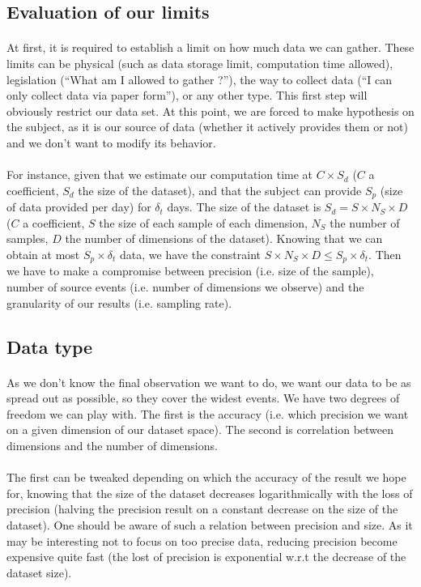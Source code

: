 \documentclass[twoside]{report}
\begin{document}
	\subsection{Evaluation of our limits}
	\paragraph{}
	At first, it is required to establish a limit on how much data we can gather. These limits can be physical (such as data storage limit, computation time allowed), legislation (\enquote{What am I allowed to gather ?}), the way to collect data (\enquote{I can only collect data via paper form}), or any other type. This first step will obviously restrict our data set. At this point, we are forced to make hypothesis on the subject, as it is our source of data (whether it actively provides them or not) and we don't want to modify its behavior.
	\paragraph{}
	For instance, given that we estimate our computation time at $C\times S_d$ ($C$ a coefficient, $S_d$ the size of the dataset), and that the subject can provide $S_p$ (size of data provided per day) for $\delta_t$ days. The size of the dataset is $S_d = S\times N_S\times D$ ($C$ a coefficient, $S$ the size of each sample of each dimension, $N_S$ the number of samples, $D$ the number of dimensions of the dataset). Knowing that we can obtain at most $S_p\times \delta_t$ data, we have the constraint $ S\times N_S\times D\leq S_p\times \delta_t$. Then we have to make a compromise between precision (i.e. size of the sample), number of source events (i.e. number of dimensions we observe) and the granularity of our results (i.e. sampling rate).
	\subsection{Data type}
	\paragraph{}
	As we don't know the final observation we want to do, we want our data to be as spread out as possible, so they cover the widest events. We have two degrees of freedom we can play with. The first is the accuracy (i.e. which precision we want on a given dimension of our dataset space). The second is correlation between dimensions and the number of dimensions. 
	\paragraph{}
	The first can be tweaked depending on which the accuracy of the result we hope for, knowing that the size of the dataset decreases logarithmically with the loss of precision (halving the precision result on a constant decrease on the size of the dataset). One should be aware of such a relation between precision and size. As it may be interesting not to focus on too precise data, reducing precision become expensive quite fast (the lost of precision is exponential w.r.t the decrease of the dataset size).
\end{document}
